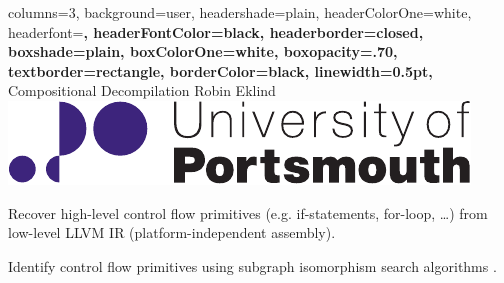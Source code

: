 \documentclass[a2paper,landscape,fontscale=0.35]{baposter}
\begin{document}
\begin{poster}{
	columns=3,
	background=user,
	headershade=plain,
	headerColorOne=white,
	headerfont=\Large\bfseries,
	headerFontColor=black,
	headerborder=closed,
	boxshade=plain,
	boxColorOne=white,
	boxopacity=.70,
	textborder=rectangle,
	borderColor=black,
	linewidth=0.5pt,
}
{}
{Compositional Decompilation}
{Robin Eklind}
{\includegraphics[height=0.05\textheight]{inc/logo.pdf}}

{
	Recover high-level control flow primitives (e.g. if-statements, for-loop, …) from low-level LLVM IR (platform-independent assembly).
}

{
	Identify control flow primitives using subgraph isomorphism search algorithms \cite{decomp_llvm}.

	\setlength{\intextsep}{5pt}
	\setlength{\abovecaptionskip}{5pt}

}
\end{poster}
\end{document}

